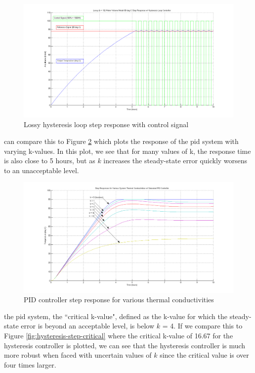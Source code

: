 \documentclass{article}
\begin{document}
\begin{figure}[H]
\begin{center}
\includegraphics[scale=0.30]{hysteresis-step-lossy.png}
\caption{Lossy hysteresis loop step response with control signal}
\label{fig:hysteresis-step-lossy}
\end{center}
\end{figure}

 can compare this to Figure \ref{fig:pid-steps-various-k} which plots the response of the \gls{pid} system with varying k-values. In this plot, we see that for many values of k, the response time is also close to 5 hours, but as $k$ increases the steady-state error quickly worsens to an unacceptable level.

\begin{figure}[H]
\begin{center}
\includegraphics[scale=0.30]{pid-steps-various-k.png}
\caption{PID controller step response for various thermal conductivities}
\label{fig:pid-steps-various-k}
\end{center}
\end{figure}

 the \gls{pid} system, the ``critical k-value", defined as the k-value for which the steady-state error is beyond an acceptable level, is below $k$ = 4. If we compare this to Figure \ref{fig:hysteresis-step-critical} where the critical k-value of 16.67 for the hysteresis controller is plotted, we can see that the hysteresis controller is much more robust when faced with uncertain values of $k$ since the critical value is over four times larger.
\end{document}

